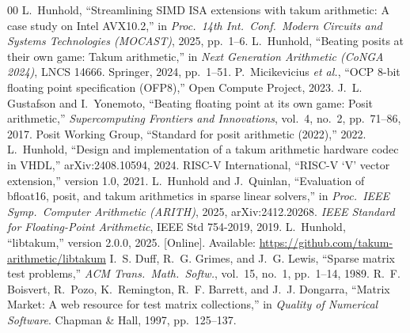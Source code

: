 \documentclass[conference]{IEEEtran}
\begin{document}
\begin{thebibliography}{00}
 L.~Hunhold, ``Streamlining SIMD ISA extensions with takum arithmetic: A case
study on Intel AVX10.2,'' in \emph{Proc.\ 14th Int.\ Conf.\ Modern Circuits and Systems Technologies
(MOCAST)}, 2025, pp.~1--6.
 L.~Hunhold, ``Beating posits at their own game: Takum arithmetic,'' in
\emph{Next Generation Arithmetic (CoNGA 2024)}, LNCS 14666. Springer, 2024, pp.~1--51.
 P.~Micikevicius \emph{et al.}, ``OCP 8-bit floating point specification (OFP8),'' Open
Compute Project, 2023.
 J.~L. Gustafson and I.~Yonemoto, ``Beating floating point at its own game:
Posit arithmetic,'' \emph{Supercomputing Frontiers and Innovations}, vol.~4, no.~2, pp.~71--86, 2017.
 Posit Working Group, ``Standard for posit arithmetic (2022),'' 2022.
 L.~Hunhold, ``Design and implementation of a takum arithmetic hardware codec
in VHDL,'' arXiv:2408.10594, 2024.
 RISC-V International, ``RISC-V `V' vector extension,'' version 1.0, 2021.
 L.~Hunhold and J.~Quinlan, ``Evaluation of bfloat16, posit, and takum
arithmetics in sparse linear solvers,'' in \emph{Proc.\ IEEE Symp.\ Computer Arithmetic (ARITH)}, 2025,
arXiv:2412.20268.
 \emph{IEEE Standard for Floating-Point Arithmetic}, IEEE Std 754-2019, 2019.
 L.~Hunhold, ``libtakum,'' version 2.0.0, 2025. [Online]. Available:
\url{https://github.com/takum-arithmetic/libtakum}
 I.~S. Duff, R.~G. Grimes, and J.~G. Lewis, ``Sparse matrix test problems,''
\emph{ACM Trans.\ Math.\ Softw.}, vol.~15, no.~1, pp.~1--14, 1989.
 R.~F. Boisvert, R.~Pozo, K.~Remington, R.~F. Barrett, and J.~J. Dongarra, ``Matrix
Market: A web resource for test matrix collections,'' in \emph{Quality of Numerical Software}.
Chapman \& Hall, 1997, pp.~125--137.
\end{thebibliography}
\end{document}
